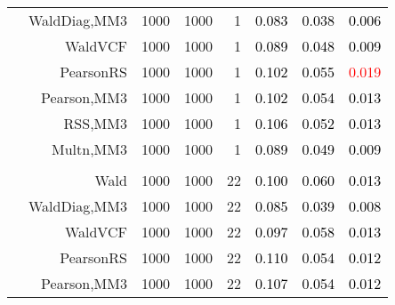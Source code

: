 \documentclass[
]{article}
\begin{document}
\begin{table}[H]
{\begin{tabular}[t]{lrrrrrrr}
\hspace{1em} & WaldDiag,MM3 & 1000 & 1000 & 1 & \textcolor{black}{0.083} & \textcolor{black}{0.038} & \textcolor{black}{0.006}\\

\hspace{1em} & WaldVCF & 1000 & 1000 & 1 & \textcolor{black}{0.089} & \textcolor{black}{0.048} & \textcolor{black}{0.009}\\

\hspace{1em} & PearsonRS & 1000 & 1000 & 1 & \textcolor{black}{0.102} & \textcolor{black}{0.055} & \textcolor{red}{0.019}\\

\hspace{1em} & Pearson,MM3 & 1000 & 1000 & 1 & \textcolor{black}{0.102} & \textcolor{black}{0.054} & \textcolor{black}{0.013}\\

\hspace{1em} & RSS,MM3 & 1000 & 1000 & 1 & \textcolor{black}{0.106} & \textcolor{black}{0.052} & \textcolor{black}{0.013}\\

\hspace{1em} & Multn,MM3 & 1000 & 1000 & 1 & \textcolor{black}{0.089} & \textcolor{black}{0.049} & \textcolor{black}{0.009}\\
\cmidrule{1-8}
\addlinespace[0.3em]
\multicolumn{8}{l}{\textbf{1F 15V}}\\
\hspace{1em} & Wald & 1000 & 1000 & 22 & \textcolor{black}{0.100} & \textcolor{black}{0.060} & \textcolor{black}{0.013}\\

\hspace{1em} & WaldDiag,MM3 & 1000 & 1000 & 22 & \textcolor{black}{0.085} & \textcolor{black}{0.039} & \textcolor{black}{0.008}\\

\hspace{1em} & WaldVCF & 1000 & 1000 & 22 & \textcolor{black}{0.097} & \textcolor{black}{0.058} & \textcolor{black}{0.013}\\

\hspace{1em} & PearsonRS & 1000 & 1000 & 22 & \textcolor{black}{0.110} & \textcolor{black}{0.054} & \textcolor{black}{0.012}\\

\hspace{1em} & Pearson,MM3 & 1000 & 1000 & 22 & \textcolor{black}{0.107} & \textcolor{black}{0.054} & \textcolor{black}{0.012}\\


\end{tabular}}
\end{table}
\end{document}
